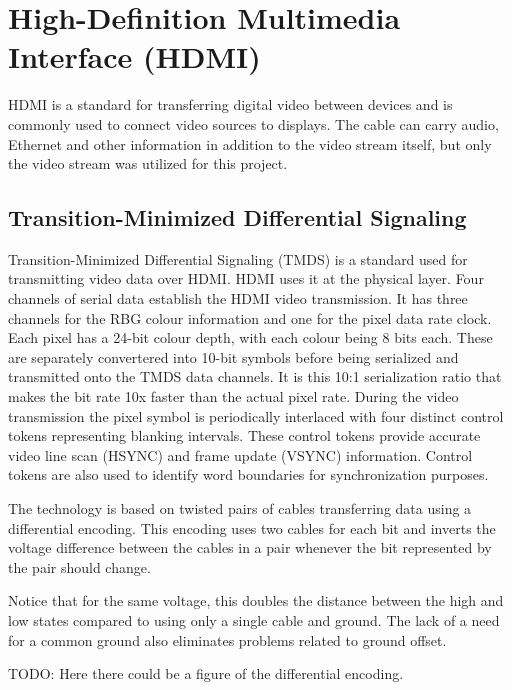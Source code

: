 \section{High-Definition Multimedia Interface (HDMI)}
HDMI is a standard for transferring digital video between devices and is commonly used to connect video sources to displays.
The cable can carry audio, Ethernet and other information in addition to the video stream itself, but only the video stream was utilized for this project.

\subsection{Transition-Minimized Differential Signaling}
Transition-Minimized Differential Signaling (TMDS) is a standard used for transmitting video data over HDMI.
HDMI uses it at the physical layer.
Four channels of serial data establish the HDMI video transmission.
It has three channels for the RBG colour information and one for the pixel data rate clock.
Each pixel has a 24-bit colour depth, with each colour being 8 bits each.
These are separately convertered into 10-bit symbols before being serialized and transmitted onto the TMDS data channels.
It is this 10:1 serialization ratio that makes the bit rate 10x faster than the actual pixel rate.
During the video transmission the pixel symbol is periodically interlaced with four distinct control tokens representing blanking intervals.
These control tokens provide accurate video line scan (HSYNC) and frame update (VSYNC) information.
Control tokens are also used to identify word boundaries for synchronization purposes.

The technology is based on twisted pairs of cables transferring data using a differential encoding.
This encoding uses two cables for each bit and inverts the voltage difference between the cables in a pair whenever the bit represented by the pair should change.

Notice that for the same voltage, this doubles the distance between the high and low states compared to using only a single cable and ground.
The lack of a need for a common ground also eliminates problems related to ground offset.

TODO: Here there could be a figure of the differential encoding.

